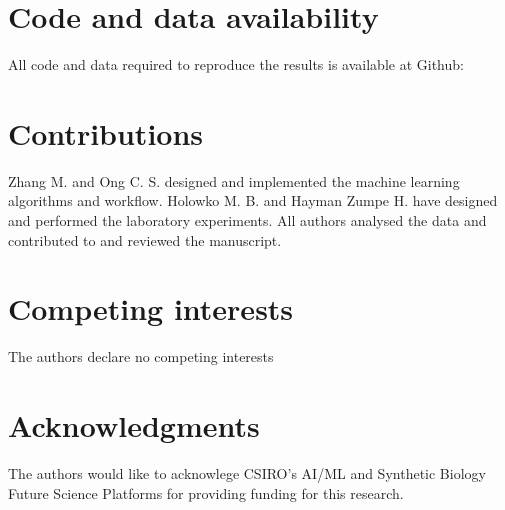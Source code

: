 \documentclass{article}
\begin{document}


\section*{Code and data availability}

All code and data required to reproduce the results is available at Github: 

\section*{Contributions}
Zhang M. and Ong C. S. designed and implemented the machine learning algorithms and workflow. Holowko M. B. and Hayman Zumpe H. have designed and performed the laboratory experiments. All authors analysed the data and contributed to and reviewed the manuscript.

\section*{Competing interests}
The authors declare no competing interests

\section*{Acknowledgments}
The authors would like to acknowlege CSIRO's AI/ML and Synthetic Biology Future Science Platforms for providing funding for this research.


\newpage

\printbibliography

\clearpage

\appendix

\end{document}
